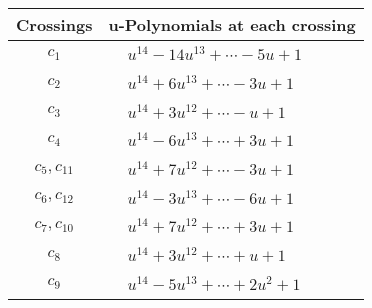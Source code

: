 \documentclass[1p]{elsarticle_modified}
\theoremstyle{definition}
\begin{document}
\begin{tabular}{m{50pt}|m{274pt}}
Crossings & \hspace{64pt}u-Polynomials at each crossing \\
\hline $$\begin{aligned}c_{1}\end{aligned}$$&$\begin{aligned}
&u^{14}-14 u^{13}+\cdots-5 u+1
\end{aligned}$\\
\hline $$\begin{aligned}c_{2}\end{aligned}$$&$\begin{aligned}
&u^{14}+6 u^{13}+\cdots-3 u+1
\end{aligned}$\\
\hline $$\begin{aligned}c_{3}\end{aligned}$$&$\begin{aligned}
&u^{14}+3 u^{12}+\cdots- u+1
\end{aligned}$\\
\hline $$\begin{aligned}c_{4}\end{aligned}$$&$\begin{aligned}
&u^{14}-6 u^{13}+\cdots+3 u+1
\end{aligned}$\\
\hline $$\begin{aligned}c_{5},c_{11}\end{aligned}$$&$\begin{aligned}
&u^{14}+7 u^{12}+\cdots-3 u+1
\end{aligned}$\\
\hline $$\begin{aligned}c_{6},c_{12}\end{aligned}$$&$\begin{aligned}
&u^{14}-3 u^{13}+\cdots-6 u+1
\end{aligned}$\\
\hline $$\begin{aligned}c_{7},c_{10}\end{aligned}$$&$\begin{aligned}
&u^{14}+7 u^{12}+\cdots+3 u+1
\end{aligned}$\\
\hline $$\begin{aligned}c_{8}\end{aligned}$$&$\begin{aligned}
&u^{14}+3 u^{12}+\cdots+u+1
\end{aligned}$\\
\hline $$\begin{aligned}c_{9}\end{aligned}$$&$\begin{aligned}
&u^{14}-5 u^{13}+\cdots+2 u^2+1
\end{aligned}$\\
\hline
\end{tabular}\\~\\
\end{document}
